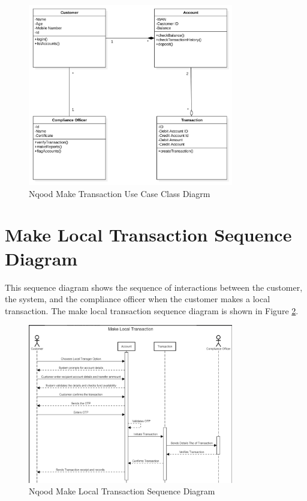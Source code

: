 \documentclass[a4paper]{report}
\begin{document}
\begin{figure}[h!]
    \centering
    \includegraphics[width=0.8\textwidth]{images/nqood-make-tx-use-case-class-diagram.png}
    \caption{Nqood Make Transaction Use Case Class Diagrm}
    \label{fig:nqood-make-transaction-use-case-class-diagram}
\end{figure}

\newpage

\section{Make Local Transaction Sequence Diagram}

This sequence diagram shows the sequence of interactions between the customer, the system, and the compliance officer when the customer makes a local transaction. The make local transaction sequence diagram is shown in Figure \ref{fig:nqood-make-local-transaction-sequence-diagram}.

\begin{figure}[h!]
    \centering
    \includegraphics[width=0.8\textwidth]{images/nqood-make-local-tx-sequence-diagram.png}
    \caption{Nqood Make Local Transaction Sequence Diagram}
    \label{fig:nqood-make-local-transaction-sequence-diagram}
\end{figure}
\end{document}
